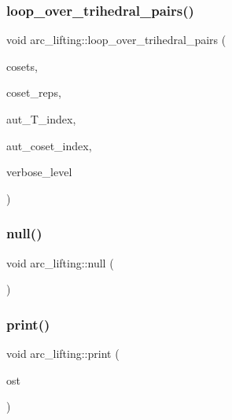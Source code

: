 \mbox{\label{classarc__lifting_a30126f5ed4126d604c191aa4d1f7505a}} 
\subsubsection{\texorpdfstring{loop\+\_\+over\+\_\+trihedral\+\_\+pairs()}{loop\_over\_trihedral\_pairs()}}
{\footnotesize\ttfamily void arc\+\_\+lifting\+::loop\+\_\+over\+\_\+trihedral\+\_\+pairs (\begin{DoxyParamCaption}\item[{\mbox{\hyperlink{classvector__ge}{vector\+\_\+ge}} $\ast$}]{cosets,  }\item[{\mbox{\hyperlink{classvector__ge}{vector\+\_\+ge}} $\ast$\&}]{coset\+\_\+reps,  }\item[{\mbox{\hyperlink{galois_8h_a09fddde158a3a20bd2dcadb609de11dc}{I\+NT}} $\ast$\&}]{aut\+\_\+\+T\+\_\+index,  }\item[{\mbox{\hyperlink{galois_8h_a09fddde158a3a20bd2dcadb609de11dc}{I\+NT}} $\ast$\&}]{aut\+\_\+coset\+\_\+index,  }\item[{\mbox{\hyperlink{galois_8h_a09fddde158a3a20bd2dcadb609de11dc}{I\+NT}}}]{verbose\+\_\+level }\end{DoxyParamCaption})}

\mbox{\label{classarc__lifting_afa544548c783fc9ac5e952dc1a2425da}} 
\subsubsection{\texorpdfstring{null()}{null()}}
{\footnotesize\ttfamily void arc\+\_\+lifting\+::null (\begin{DoxyParamCaption}{ }\end{DoxyParamCaption})}

\mbox{\label{classarc__lifting_ae1609cb80720bc005f0fc3ea65150185}} 
\subsubsection{\texorpdfstring{print()}{print()}}
{\footnotesize\ttfamily void arc\+\_\+lifting\+::print (\begin{DoxyParamCaption}\item[{ostream \&}]{ost }\end{DoxyParamCaption})}

